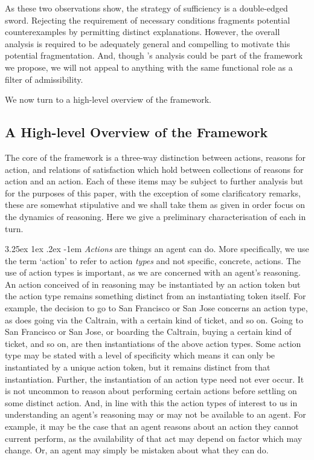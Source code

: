 \documentclass[10pt]{article}
\makeatletter
\renewcommand\paragraph{\@startsection{paragraph}{5}{\z@}%
  {3.25ex \@plus1ex \@minus.2ex}%
  {-1em}%
  {\normalfont\normalsize\bfseries}}
\makeatother
\begin{document}
As these two observations show, the strategy of sufficiency is a double-edged sword.
Rejecting the requirement of necessary conditions fragments potential counterexamples by permitting distinct explanations.
However, the overall analysis is required to be adequately general and compelling to motivate this potential fragmentation.
And, though \citeauthor{Bratman:1987aa}'s analysis could be part of the framework we propose, we will not appeal to anything with the same functional role as a filter of admissibility.

We now turn to a high-level overview of the framework.

\subsection{A High-level Overview of the Framework}
\label{sec:high-level-overview}

The core of the framework is a three-way distinction between actions, reasons for action, and relations of satisfaction which hold between collections of reasons for action and an action.
Each of these items may be subject to further analysis but for the purposes of this paper, with the exception of some clarificatory remarks, these are somewhat stipulative and we shall take them as given in order focus on the dynamics of reasoning.
Here we give a preliminary characterisation of each in turn.


\paragraph{ }%
\emph{Actions} are things an agent can do.
More specifically, we use the term `action' to refer to action \emph{types} and not specific, concrete, actions.
The use of action types is important, as we are concerned with an agent's reasoning.
An action conceived of in reasoning may be instantiated by an action token but the action type remains something distinct from an instantiating token itself.
For example, the decision to go to San Francisco or San Jose concerns an action type, as does going via the Caltrain, with a certain kind of ticket, and so on.
Going to San Francisco or San Jose, or boarding the Caltrain, buying a certain kind of ticket, and so on, are then instantiations of the above action types.
Some action type may be stated with a level of specificity which means it can only be instantiated by a unique action token, but it remains distinct from that instantiation.
Further, the instantiation of an action type need not ever occur.
It is not uncommon to reason about performing certain actions before settling on some distinct action.
And, in line with this the action types of interest to us in understanding an agent's reasoning may or may not be available to an agent.
For example, it may be the case that an agent reasons about an action they cannot current perform, as the availability of that act may depend on factor which may change.
Or, an agent may simply be mistaken about what they can do.
\end{document}
